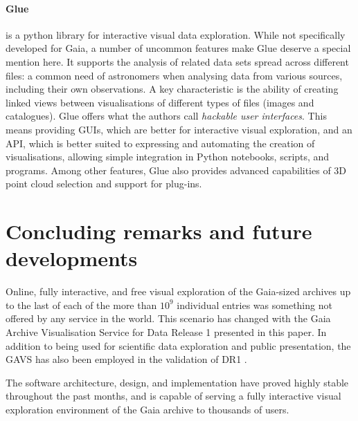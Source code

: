\documentclass[longauth, final]{aa}
\begin{document}
\paragraph{Glue}\citep{2015ASPC..495..101B} is a python library for interactive visual data exploration. While not specifically developed for Gaia, a number of uncommon features make Glue deserve a special mention here. It supports the analysis of related data sets spread across different files: a common need of astronomers when analysing data from various sources, including their own observations. A key characteristic is the ability of creating linked views between visualisations of different types of files (images and catalogues).
Glue offers what the authors call \emph{hackable user interfaces}. This means providing GUIs, which are better for interactive  visual exploration, and an API, which is better suited to expressing and automating the creation of visualisations, allowing simple integration in Python notebooks, scripts, and programs. Among other features, Glue also provides advanced capabilities of 3D point cloud selection and support for plug-ins.






\section{Concluding remarks and future developments}
\label{sec:conclusions}

Online, fully interactive, and free visual exploration of the Gaia-sized archives up to the last  of each of the more than $10^9$ individual entries  was something not offered by any service in the world. This scenario has changed with the Gaia Archive Visualisation Service for Data Release 1 presented in this paper. In addition to being used for scientific data exploration and public presentation, the GAVS has also been employed in the validation of DR1 \citep{2017A&A...599A..50A}. 

The software architecture, design, and  implementation have proved highly stable throughout the past months, and is capable of serving a fully interactive visual exploration environment of the Gaia archive to thousands of users.
\end{document}
